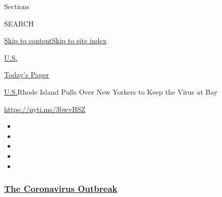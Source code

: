 Sections

SEARCH

\protect\hyperlink{site-content}{Skip to
content}\protect\hyperlink{site-index}{Skip to site index}

\href{https://www.nytimes3xbfgragh.onion/section/us}{U.S.}

\href{https://myaccount.nytimes3xbfgragh.onion/auth/login?response_type=cookie\&client_id=vi}{}

\href{https://www.nytimes3xbfgragh.onion/section/todayspaper}{Today's
Paper}

\href{/section/us}{U.S.}\textbar{}Rhode Island Pulls Over New Yorkers to
Keep the Virus at Bay

\url{https://nyti.ms/3bwvBSZ}

\begin{itemize}
\item
\item
\item
\item
\item
\end{itemize}

\hypertarget{the-coronavirus-outbreak}{%
\subsubsection{\texorpdfstring{\href{https://www.nytimes3xbfgragh.onion/news-event/coronavirus?name=styln-coronavirus-national\&region=TOP_BANNER\&block=storyline_menu_recirc\&action=click\&pgtype=Article\&impression_id=e83e2000-f4cd-11ea-bbde-33ae2248a786\&variant=undefined}{The
Coronavirus
Outbreak}}{The Coronavirus Outbreak}}\label{the-coronavirus-outbreak}}

